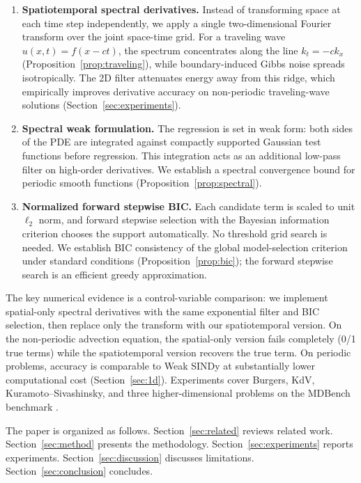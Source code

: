 \documentclass[preprint,12pt]{elsarticle}
\begin{document}
\begin{enumerate}
\item \textbf{Spatiotemporal spectral derivatives.} Instead of transforming space at each time step independently, we apply a single two-dimensional Fourier transform over the joint space-time grid. For a traveling wave $u(x,t)=f(x-ct)$, the spectrum concentrates along the line $k_t=-ck_x$ (Proposition~\ref{prop:traveling}), while boundary-induced Gibbs noise spreads isotropically. The 2D filter attenuates energy away from this ridge, which empirically improves derivative accuracy on non-periodic traveling-wave solutions (Section~\ref{sec:experiments}).

\item \textbf{Spectral weak formulation.} The regression is set in weak form: both sides of the PDE are integrated against compactly supported Gaussian test functions before regression. This integration acts as an additional low-pass filter on high-order derivatives. We establish a spectral convergence bound for periodic smooth functions (Proposition~\ref{prop:spectral}).

\item \textbf{Normalized forward stepwise BIC.} Each candidate term is scaled to unit $\ell_2$ norm, and forward stepwise selection with the Bayesian information criterion \cite{schwarz1978estimating} chooses the support automatically. No threshold grid search is needed. We establish BIC consistency of the global model-selection criterion under standard conditions (Proposition~\ref{prop:bic}); the forward stepwise search is an efficient greedy approximation.
\end{enumerate}

The key numerical evidence is a control-variable comparison: we implement spatial-only spectral derivatives with the same exponential filter and BIC selection, then replace only the transform with our spatiotemporal version. On the non-periodic advection equation, the spatial-only version fails completely (0/1 true terms) while the spatiotemporal version recovers the true term. On periodic problems, accuracy is comparable to Weak SINDy at substantially lower computational cost (Section~\ref{sec:1d}). Experiments cover Burgers, KdV, Kuramoto--Sivashinsky, and three higher-dimensional problems on the MDBench benchmark \cite{ziaei2025mdbench}.

The paper is organized as follows. Section~\ref{sec:related} reviews related work. Section~\ref{sec:method} presents the methodology. Section~\ref{sec:experiments} reports experiments. Section~\ref{sec:discussion} discusses limitations. Section~\ref{sec:conclusion} concludes.
\end{document}
